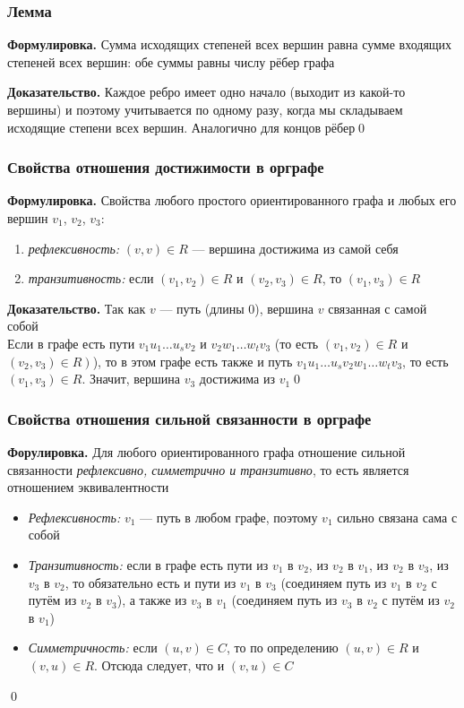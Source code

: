 \documentclass[a4paper]{article}
\begin{document}
\subsubsection*{Лемма}
\textbf{Формулировка.} Сумма исходящих степеней всех вершин равна сумме входящих степеней всех вершин: обе суммы равны числу рёбер графа

\textbf{Доказательство.} Каждое ребро имеет одно начало (выходит из какой-то вершины) и поэтому учитывается по одному разу, когда мы складываем исходящие степени всех вершин. Аналогично для концов рёбер\qed

\subsubsection*{Свойства отношения достижимости в орграфе}
\textbf{Формулировка.} Свойства любого простого ориентированного графа и любых его вершин $v_1$, $v_2$, $v_3$:
\begin{enumerate}
    \item \textit{рефлексивность:} $(v,v)\in R$ — вершина достижима из самой себя
    \item \textit{транзитивность:} если $(v_1,v_2)\in R$ и $(v_2,v_3)\in R$, то $(v_1,v_3)\in R$
\end{enumerate}

\textbf{Доказательство.} Так как $v$ — путь (длины 0), вершина $v$ связанная с самой собой\\[2mm]
 Если в графе есть пути $v_{1} u_{1} \ldots u_{s} v_{2}$ и $v_{2} w_{1} \ldots w_{t} v_{3}$ (то есть $\left(v_{1}, v_{2}\right) \in R$ и $\left.\left(v_{2}, v_{3}\right) \in R\right)$), то в этом графе есть также и путь $v_{1} u_{1} \ldots u_{s} v_{2} w_{1} \ldots w_{t} v_{3}$, то есть $\left(v_{1}, v_{3}\right) \in R$. Значит, вершина $v_{3}$ достижима из $v_{1}$\qed


\subsubsection*{Свойства отношения сильной связанности в орграфе}
\textbf{Форулировка.} Для любого ориентированного графа отношение сильной связанности \textit{рефлексивно, симметрично и транзитивно}, то есть является отношением эквивалентности\\[2mm]
\proof 
\begin{itemize}
    \item \textit{Рефлексивность:} $v_1$ — путь в любом графе, поэтому $v_1$ сильно связана сама с собой
    \item \textit{Транзитивность:} если в графе есть пути из $v_1$ в $v_2$, из $v_2$ в $v_1$, из $v_2$ в $v_3$, из $v_3$ в $v_2$, то обязательно есть и пути из $v_1$ в $v_3$ (соединяем путь из $v_1$ в $v_2$ с путём из $v_2$ в $v_3$), а также из $v_3$ в $v_1$ (соединяем путь из $v_3$ в $v_2$ с путём из $v_2$ в $v_1$)
    \item \textit{Симметричность:} если $(u, v) \in C$, то по определению $(u, v) \in R$ и $(v, u) \in R$. Отсюда следует, что и $(v, u) \in C$
\end{itemize}\qed 
\end{document}
